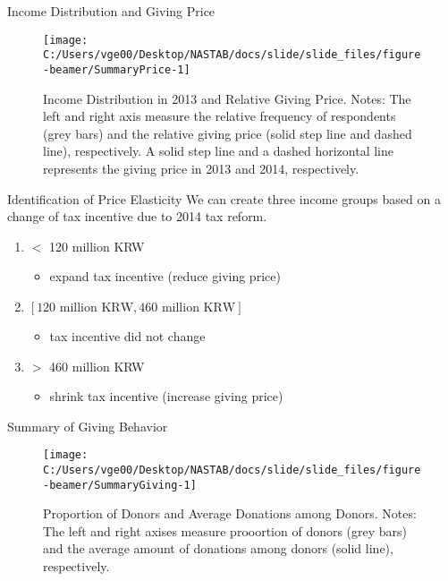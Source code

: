 \documentclass[
  ignorenonframetext,
  aspectratio=169,
]{beamer}
\providecommand{\tightlist}{%
  \setlength{\itemsep}{0pt}\setlength{\parskip}{0pt}}
\begin{document}
\begin{frame}{Income Distribution and Giving Price}
\protect\hypertarget{income-distribution-and-giving-price}{}
\begin{figure}[t]

{\centering \texttt{[image: C:/Users/vge00/Desktop/NASTAB/docs/slide/slide\_files/figure-beamer/SummaryPrice-1]} 

}

\caption{Income Distribution in 2013 and Relative Giving Price. Notes: The left and right axis measure the relative frequency of respondents (grey bars) and the relative giving price (solid step line and dashed line), respectively. A solid step line and a dashed horizontal line represents the giving price in 2013 and 2014, respectively.}\label{fig:SummaryPrice}
\end{figure}
\end{frame}

\begin{frame}{Identification of Price Elasticity}
\protect\hypertarget{identification-of-price-elasticity}{}
We can create three income groups based on
a change of tax incentive due to 2014 tax reform.

\begin{enumerate}
\tightlist
\item
  \(<\) 120 million KRW

  \begin{itemize}
  \tightlist
  \item
    expand tax incentive (reduce giving price)
  \end{itemize}
\item
  \([\text{120 million KRW}, \text{460 million KRW}]\)

  \begin{itemize}
  \tightlist
  \item
    tax incentive did not change
  \end{itemize}
\item
  \(>\) 460 million KRW

  \begin{itemize}
  \tightlist
  \item
    shrink tax incentive (increase giving price)
  \end{itemize}
\end{enumerate}
\end{frame}

\begin{frame}{Summary of Giving Behavior}
\protect\hypertarget{summary-of-giving-behavior}{}
\begin{figure}[t]

{\centering \texttt{[image: C:/Users/vge00/Desktop/NASTAB/docs/slide/slide\_files/figure-beamer/SummaryGiving-1]} 

}

\caption{Proportion of Donors and Average Donations among Donors. Notes: The left and right axises measure prooortion of donors (grey bars) and the average amount of donations among donors (solid line), respectively.}\label{fig:SummaryGiving}
\end{figure}
\end{frame}
\end{document}
